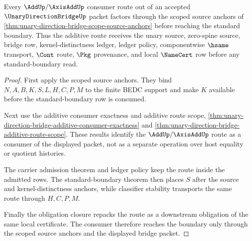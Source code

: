 \begin{theorem}
\label{thm:unary-direction-bridge-scope-additive-route}
Every $\AddUp/\AxisAddUp$ consumer route out of an accepted $\UnaryDirectionBridgeUp$ packet factors through the scoped source anchors of \autoref{thm:unary-direction-bridge-scope-source-anchors} before reaching the standard boundary. Thus the additive route receives the unary source, zero-spine source, bridge row, kernel-distinctness ledger, ledger policy, componentwise $\hsame$ transport, $\Cont$ route, $\Pkg$ provenance, and local $\NameCert$ row before any standard-boundary read.
\end{theorem}
\begin{proof}
First apply the scoped source anchors. They bind $N,A,B,K,S,L,H,C,P,M$ to the finite BEDC support and make $K$ available before the standard-boundary row is consumed.

Next use the additive consumer exactness and additive route scope, \autoref{thm:unary-direction-bridge-additive-consumer-exactness} and \autoref{thm:unary-direction-bridge-additive-route-scope}. These results identify the $\AddUp/\AxisAddUp$ route as a consumer of the displayed packet, not as a separate operation over host equality or quotient histories.

The carrier admission theorem and ledger policy keep the route inside the admitted rows. The standard-boundary theorem then places $S$ after the source and kernel-distinctness anchors, while classifier stability transports the same route through $H,C,P,M$.

Finally the obligation closure repacks the route as a downstream obligation of the same local certificate. The consumer therefore reaches the boundary only through the scoped source anchors and the displayed bridge packet.
\end{proof}

